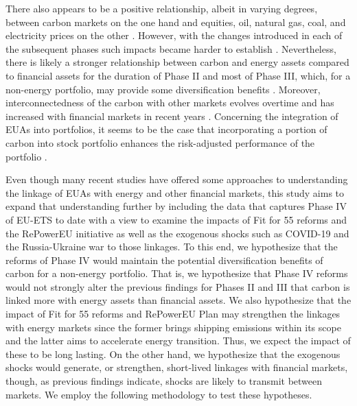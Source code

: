 \documentclass[preprint, 3p,
authoryear]{elsarticle} %
\begin{document}
There also appears to be a positive relationship, albeit in varying
degrees, between carbon markets on the one hand and equities, oil,
natural gas, coal, and electricity prices on the other
\citep{mansanet-bataller_co_2007, alberola_price_2008, keppler_causalities_2010, bredin_emerging_2011, chevallier_evaluating_2011, creti_carbon_2012, aatola_price_2013, zhang_dynamic_2016, ji_information_2018}.
However, with the changes introduced in each of the subsequent phases
such impacts became harder to establish
\citep{arouri_nonlinearities_2012, wu_market-linkage_2020}.
Nevertheless, there is likely a stronger relationship between carbon and
energy assets compared to financial assets for the duration of Phase II
and most of Phase III, which, for a non-energy portfolio, may provide
some diversification benefits
\citep{tan_how_2020, lovcha_determinants_2022, yang_idiosyncratic_2022}.
Moreover, interconnectedness of the carbon with other markets evolves
overtime and has increased with financial markets in recent years
\citep{jimenez-rodriguez_what_2019, tan_how_2020, dong_risk_2024}.
Concerning the integration of EUAs into portfolios, it seems to be the
case that incorporating a portion of carbon into stock portfolio
enhances the risk-adjusted performance of the portfolio
\citep{demiralay_carbon_2022}.

Even though many recent studies have offered some approaches to
understanding the linkage of EUAs with energy and other financial
markets, this study aims to expand that understanding further by
including the data that captures Phase IV of EU-ETS to date with a view
to examine the impacts of Fit for 55 reforms and the RePowerEU
initiative as well as the exogenous shocks such as COVID-19 and the
Russia-Ukraine war to those linkages. To this end, we hypothesize that
the reforms of Phase IV would maintain the potential diversification
benefits of carbon for a non-energy portfolio. That is, we hypothesize
that Phase IV reforms would not strongly alter the previous findings for
Phases II and III that carbon is linked more with energy assets than
financial assets. We also hypothesize that the impact of Fit for 55
reforms and RePowerEU Plan may strengthen the linkages with energy
markets since the former brings shipping emissions within its scope and
the latter aims to accelerate energy transition. Thus, we expect the
impact of these to be long lasting. On the other hand, we hypothesize
that the exogenous shocks would generate, or strengthen, short-lived
linkages with financial markets, though, as previous findings indicate,
shocks are likely to transmit between markets. We employ the following
methodology to test these hypotheses.
\end{document}
